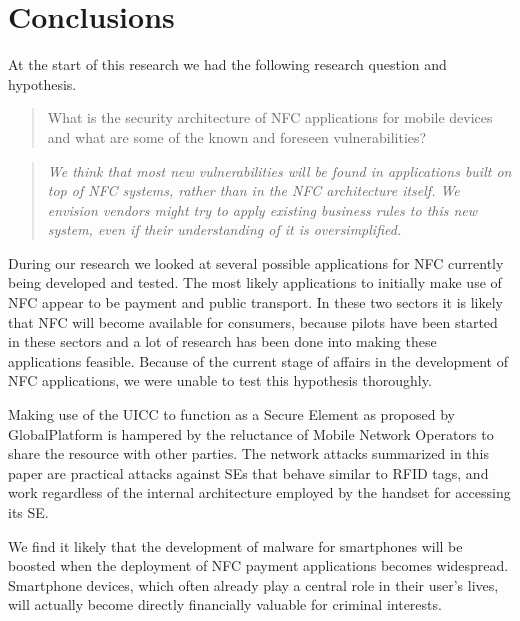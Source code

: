 \label{chap:conclusions}
\section{Conclusions}

At the start of this research we had the following research question and hypothesis. 

\begin{quote}
What is the security architecture of NFC applications for mobile devices and what are some of the known and foreseen vulnerabilities?
\end{quote}

\begin{quote}
\textit{We think that most new vulnerabilities will be found in applications built on top of NFC systems, rather than in the NFC architecture itself.
We envision vendors might try to apply existing business rules to this new system, even if their understanding of it is oversimplified.}
\end{quote}

During our research we looked at several possible applications for NFC currently being developed and tested.
The most likely applications to initially make use of NFC appear to be payment and public transport.
In these two sectors it is likely that NFC will become available for consumers, because pilots have been started in these sectors and a lot of research has been done into making these applications feasible.
Because of the current stage of affairs in the development of NFC applications, we were unable to test this hypothesis thoroughly.

Making use of the UICC to function as a Secure Element as proposed by GlobalPlatform is hampered by the reluctance of Mobile Network Operators to share the resource with other parties.
The network attacks summarized in this paper are practical attacks against SEs that behave similar to RFID tags, and work regardless of the internal architecture employed by the handset for accessing its SE.

We find it likely that the development of malware for smartphones will be boosted when the deployment of NFC payment applications becomes widespread.
Smartphone devices, which often already play a central role in their user's lives, will actually become directly financially valuable for criminal interests.



